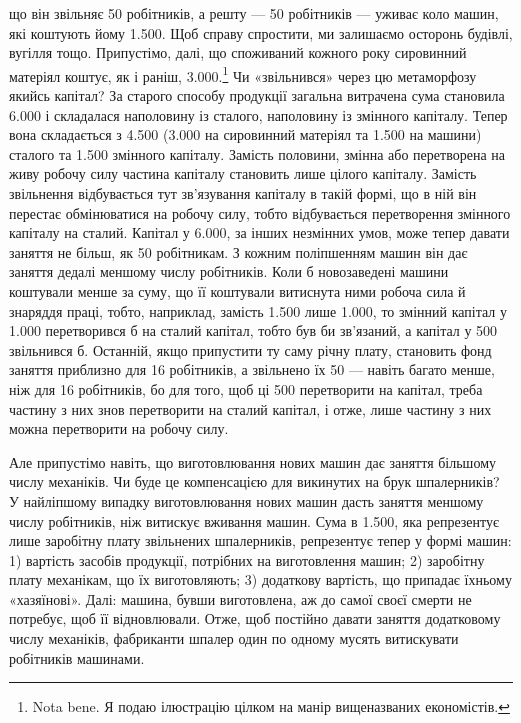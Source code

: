 \parcont{}  %
що він звільняє 50 робітників, а решту — 50 робітників — уживає
коло машин, які коштують йому 1.500. Щоб
справу спростити, ми залишаємо осторонь будівлі, вугілля тощо.
Припустімо, далі, що споживаний кожного року сировинний
матеріял коштує, як і раніш, 3.000.\footnote{
Nota bene. Я подаю ілюстрацію цілком на манір вищеназваних
економістів.
} Чи «звільнився» через цю метаморфозу якийсь капітал? За старого
способу продукції загальна витрачена сума становила 6.000 і складалася наполовину із сталого, наполовину із
змінного капіталу. Тепер вона складається з 4.500
(3.000 на сировинний матеріял та 1.500 на машини) сталого та 1.500 змінного
капіталу. Замість половини, змінна або перетворена на живу робочу
силу частина капіталу становить лише цілого капіталу. Замість
звільнення відбувається тут зв’язування капіталу в такій формі,
що в ній він перестає обмінюватися на робочу силу, тобто відбувається
перетворення змінного капіталу на сталий. Капітал у 6.000, за інших незмінних умов, може тепер давати заняття
не більш, як 50 робітникам. З кожним поліпшенням машин він
дає заняття дедалі меншому числу робітників. Коли б новозаведені
машини коштували менше за суму, що її коштували витиснута
ними робоча сила й знаряддя праці, тобто, наприклад, замість
1.500 лише 1.000, то змінний
капітал у 1.000 перетворився б на сталий капітал,
тобто був би зв’язаний, а капітал у 500
звільнився б. Останній, якщо припустити ту саму річну плату,
становить фонд заняття приблизно для 16 робітників, а звільнено
їх 50 — навіть багато менше, ніж для 16 робітників, бо для того,
щоб ці 500 перетворити на капітал, треба частину
з них знов перетворити на сталий капітал, і отже, лише частину
з них можна перетворити на робочу силу.

Але припустімо навіть, що виготовлювання нових машин дає
заняття більшому числу механіків. Чи буде це компенсацією
для викинутих на брук шпалерників? У найліпшому випадку
виготовлювання нових машин дасть заняття меншому числу
робітників, ніж витискує вживання машин. Сума в 1.500, яка репрезентує лише заробітну плату звільнених
шпалерників, репрезентує тепер у формі машин: 1) вартість засобів
продукції, потрібних на виготовлення машин; 2) заробітну
плату механікам, що їх виготовляють; 3) додаткову вартість, що
припадає їхньому «хазяїнові». Далі: машина, бувши виготовлена,
аж до самої своєї смерти не потребує, щоб її відновлювали. Отже,
щоб постійно давати заняття додатковому числу механіків, фабриканти
шпалер один по одному мусять витискувати робітників
машинами.

